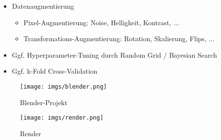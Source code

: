 \begin{enumerate}
\begin{itemize}
        \item Datenaugmentierung
        \begin{itemize}
            \item Pixel-Augmentierung: Noise, Helligkeit, Kontrast, ...
            \item Transformations-Augmentierung: Rotation, Skalierung, Flips, ...
        \end{itemize}

        \item Ggf. Hyperparameter-Tuning durch Random Grid / Bayesian Search
        \item Ggf. k-Fold Cross-Validation
    \end{itemize}

\end{enumerate}

\begin{figure}
    \centering
    \texttt{[image: imgs/blender.png]}
    \caption{Blender-Projekt}
    \label{img:blender}
\end{figure}

\begin{figure}
    \centering
    \texttt{[image: imgs/render.png]}
    \caption{Render}
    \label{img:render}
\end{figure}
